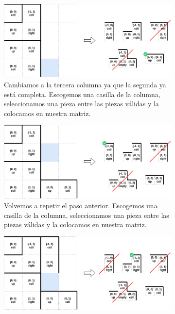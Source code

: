     \begin{figure}[H]
    \ContinuedFloat 
    \centering
        \begin{subfigure}[b]{0.95\textwidth}
            \centering
            \includegraphics[scale=0.45]{img/paso4.png}
            \caption{Cambiamos a la tercera columna ya que la segunda ya está completa. Escogemos una casilla de la columna, seleccionamos una pieza entre las piezas válidas y la colocamos en nuestra matriz.}
        \end{subfigure}
        \par\bigskip
        \begin{subfigure}[b]{0.95\textwidth}
            \centering
            \includegraphics[scale=0.45]{img/paso5.png}
            \caption{Volvemos a repetir el paso anterior. Escogemos una casilla de la columna, seleccionamos una pieza entre las piezas válidas y la colocamos en nuestra matriz.}
        \end{subfigure}
        \par\bigskip
        \begin{subfigure}[b]{0.95\textwidth}
            \centering
            \includegraphics[scale=0.45]{img/paso6.png}

\end{subfigure}
\end{figure}
